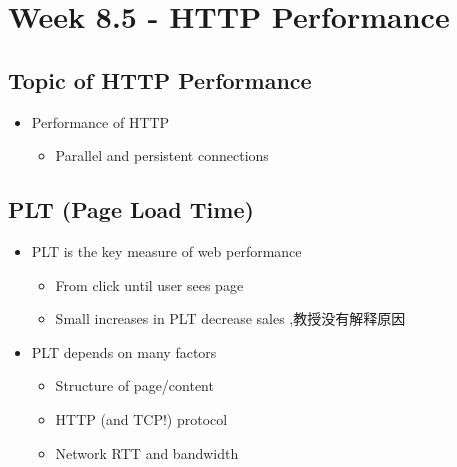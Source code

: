 \documentclass[12pt]{ctexart}   %
\begin{document}
\section{Week 8.5 - HTTP Performance}	
	\subsection{Topic of HTTP Performance}
	\begin{itemize}
		\item Performance of HTTP
		\begin{itemize}
			\item Parallel and persistent connections
		\end{itemize}
	\end{itemize}
	
	\subsection{PLT (Page Load Time)}
	\begin{itemize}
		\item PLT is the key measure of web performance
		\begin{itemize}
			\item From click until user sees page
			\item Small increases in PLT decrease sales ,教授没有解释原因
		\end{itemize}
		
		\item PLT depends on many factors
		\begin{itemize}
			\item Structure of page/content
			\item HTTP (and TCP!) protocol
			\item Network RTT and bandwidth
		\end{itemize}
	\end{itemize}
	
\end{document}
